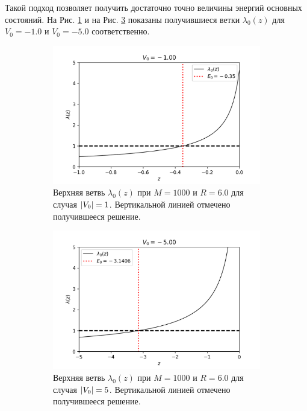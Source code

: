 \documentclass[10pt]{article}
\begin{document}
Такой подход позволяет получить достаточно точно величины энергий основных состояний. На Рис. \ref{fig:-1.0_l0} и на Рис. \ref{fig:-5.0_l0} показаны получившиеся ветки $\lambda_0(z)$ для $V_0 = -1.0$ и $V_0=-5.0$ соответственно.
\begin{figure}[htbp]
 \centering
 \begin{subfigure}[b]{0.49\textwidth}
    \includegraphics[width=\textwidth]{../figures/-1.0_l0}
    \caption{Верхняя ветвь $\lambda_0(z)$ при $M=1000$ и $R=6.0$ для случая $\abs{V_0}=1$. Вертикальной линией отмечено получившееся решение.}
    \label{fig:-1.0_l0}
\end{subfigure}
\hfill
\begin{subfigure}[b]{0.49\textwidth}
    \centering
    \includegraphics[width=\textwidth]{../figures/-5.0_l0}
    \caption{Верхняя ветвь $\lambda_0(z)$ при $M=1000$ и $R=6.0$ для случая $\abs{V_0}=5$. Вертикальной линией отмечено получившееся решение.}
    \label{fig:-5.0_l0}
\end{subfigure}
\caption{}
\end{figure}
\end{document}
